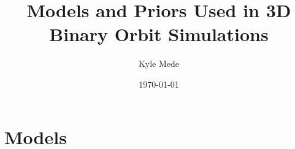 \documentclass[12pt,preprint]{aastex}
\title{Models and Priors Used in 3D Binary Orbit Simulations}
\author{Kyle Mede}
\date{\today}
\begin{document}
\maketitle


\tableofcontents

\section{Models}
\citet{duquennoy1991}

\pagebreak

\clearpage
\end{document}
